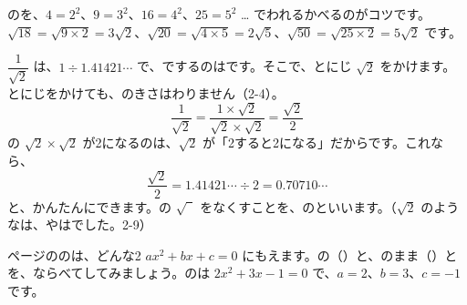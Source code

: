 のを、$4=2^2$、$9=3^2$、$16=4^2$、$25=5^2$ … でわれるかべるのがコツです。$\sqrt{18}=\sqrt{9\times2}=3\sqrt{2}$、$\sqrt{20}=\sqrt{4\times5}=2\sqrt{5}$、$\sqrt{50}=\sqrt{25\times2}=5\sqrt{2}$ です。

$\dfrac{1}{\sqrt{2}}$ は、$1\div1.41421\cdots$ で、でするのはです。そこで、とにじ $\sqrt{2}$ をかけます。とにじをかけても、のきさはわりません（2-4）。
\[ \frac{1}{\sqrt{2}}=\frac{1\times\sqrt{2}}{\sqrt{2}\times\sqrt{2}}=\frac{\sqrt{2}}{2} \]
の $\sqrt{2}\times\sqrt{2}$ が2になるのは、$\sqrt{2}$ が「2すると2になる」だからです。これなら、
\[ \frac{\sqrt{2}}{2}=1.41421\cdots\div2=0.70710\cdots \]
と、かんたんにできます。の $\sqrt{\phantom{2}}$ をなくすことを、の\textbf{}といいます。（$\sqrt{2}$ のようなは、やはでした。2-9）


\leavevmode\label{bk:3-10:kousiki}\pageref{bk:3-10:heihou}ページののは、どんな2 $ax^2+bx+c=0$ にもえます。の（）と、のまま（）とを、ならべてしてみましょう。のは $2x^2+3x-1=0$ で、$a=2$、$b=3$、$c=-1$ です。

